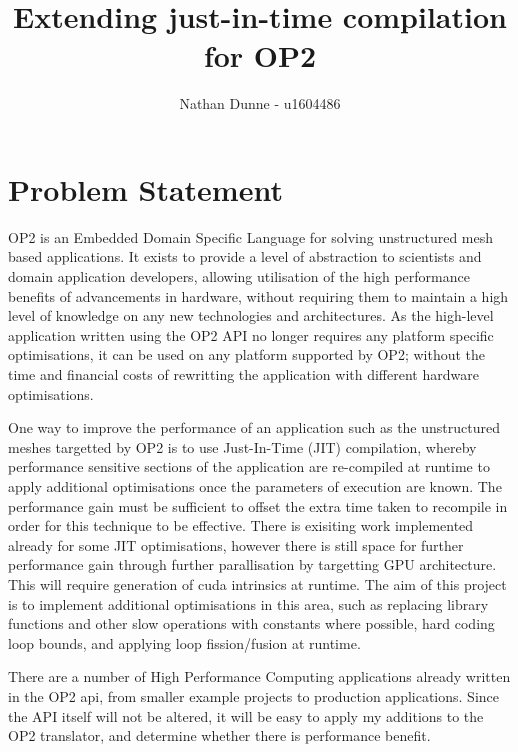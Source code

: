 \documentclass[11pt]{article}
\title{Extending just-in-time compilation for OP2}
\author{Nathan Dunne - u1604486}
\begin{document}
\maketitle
\section*{Problem Statement}
OP2 is an Embedded Domain Specific Language for solving unstructured mesh based applications. It exists to provide a level of abstraction to scientists and domain application developers, allowing utilisation of the high performance benefits of advancements in hardware, without requiring them to maintain a high level of knowledge on any new technologies and architectures. As the high-level application written using the OP2 API no longer requires any platform specific optimisations, it can be used on any platform supported by OP2; without the time and financial costs of rewritting the application with different hardware optimisations.
\newline
\par
One way to improve the performance of an application such as the unstructured meshes targetted by OP2 is to use Just-In-Time (JIT) compilation, whereby performance sensitive sections of the application are re-compiled at runtime to apply additional optimisations once the parameters of execution are known. The performance gain must be sufficient to offset the extra time taken to recompile in order for this technique to be effective. There is exisiting work implemented already for some JIT optimisations, however there is still space for further performance gain through further parallisation by targetting GPU architecture. This will require generation of cuda intrinsics at runtime. The aim of this project is to implement additional optimisations in this area, such as replacing library functions and other slow operations with constants where possible, hard coding loop bounds, and applying loop fission/fusion at runtime.
\newline
\par
There are a number of High Performance Computing applications already written in the OP2 api, from smaller example projects to production applications. Since the API itself will not be altered, it will be easy to apply my additions to the OP2 translator, and determine whether there is performance benefit.
\end{document}
